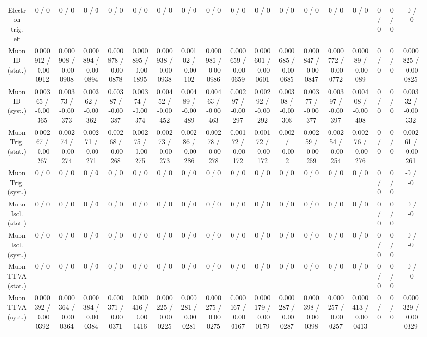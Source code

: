 \documentclass[10pt]{article}
\begin{document}
\begin{table}[htbp]
\begin{center}
\begin{tabular}{|c|c|c|c|c|c|c|c|c|c|c|c|c|c|c|c|c|c|}
  Electron trig. eff & 0 / 0 & 0 / 0 & 0 / 0 & 0 / 0 & 0 / 0 & 0 / 0 & 0 / 0 & 0 / 0 & 0 / 0 & 0 / 0 & 0 / 0 & 0 / 0 & 0 / 0 & 0 / 0 & 0 / 0 & 0 / 0 & -0 / -0 \\ 
  Muon ID (stat.) & 0.000912 / -0.000912 & 0.000908 / -0.000908 & 0.000894 / -0.000894 & 0.000878 / -0.000878 & 0.000895 / -0.000895 & 0.000938 / -0.000938 & 0.00102 / -0.00102 & 0.000986 / -0.000986 & 0.000659 / -0.000659 & 0.000601 / -0.000601 & 0.000685 / -0.000685 & 0.000847 / -0.000847 & 0.000772 / -0.000772 & 0.00089 / -0.00089 & 0 / 0 & 0 / 0 & 0.000825 / -0.000825 \\ 
  Muon ID (syst.) & 0.00365 / -0.00365 & 0.00373 / -0.00373 & 0.00362 / -0.00362 & 0.00387 / -0.00387 & 0.00374 / -0.00374 & 0.00452 / -0.00452 & 0.00489 / -0.00489 & 0.00463 / -0.00463 & 0.00297 / -0.00297 & 0.00292 / -0.00292 & 0.00308 / -0.00308 & 0.00377 / -0.00377 & 0.00397 / -0.00397 & 0.00408 / -0.00408 & 0 / 0 & 0 / 0 & 0.00332 / -0.00332 \\ 
  Muon Trig. (stat.) & 0.00267 / -0.00267 & 0.00274 / -0.00274 & 0.00271 / -0.00271 & 0.00268 / -0.00268 & 0.00275 / -0.00275 & 0.00273 / -0.00273 & 0.00286 / -0.00286 & 0.00278 / -0.00278 & 0.00172 / -0.00172 & 0.00172 / -0.00172 & 0.002 / -0.002 & 0.00259 / -0.00259 & 0.00254 / -0.00254 & 0.00276 / -0.00276 & 0 / 0 & 0 / 0 & 0.00261 / -0.00261 \\ 
  Muon Trig. (syst.) & 0 / 0 & 0 / 0 & 0 / 0 & 0 / 0 & 0 / 0 & 0 / 0 & 0 / 0 & 0 / 0 & 0 / 0 & 0 / 0 & 0 / 0 & 0 / 0 & 0 / 0 & 0 / 0 & 0 / 0 & 0 / 0 & -0 / -0 \\ 
  Muon Isol. (stat.) & 0 / 0 & 0 / 0 & 0 / 0 & 0 / 0 & 0 / 0 & 0 / 0 & 0 / 0 & 0 / 0 & 0 / 0 & 0 / 0 & 0 / 0 & 0 / 0 & 0 / 0 & 0 / 0 & 0 / 0 & 0 / 0 & -0 / -0 \\ 
  Muon Isol. (syst.) & 0 / 0 & 0 / 0 & 0 / 0 & 0 / 0 & 0 / 0 & 0 / 0 & 0 / 0 & 0 / 0 & 0 / 0 & 0 / 0 & 0 / 0 & 0 / 0 & 0 / 0 & 0 / 0 & 0 / 0 & 0 / 0 & -0 / -0 \\ 
  Muon TTVA (stat.) & 0 / 0 & 0 / 0 & 0 / 0 & 0 / 0 & 0 / 0 & 0 / 0 & 0 / 0 & 0 / 0 & 0 / 0 & 0 / 0 & 0 / 0 & 0 / 0 & 0 / 0 & 0 / 0 & 0 / 0 & 0 / 0 & -0 / -0 \\ 
  Muon TTVA (syst.) & 0.000392 / -0.000392 & 0.000364 / -0.000364 & 0.000384 / -0.000384 & 0.000371 / -0.000371 & 0.000416 / -0.000416 & 0.000225 / -0.000225 & 0.000281 / -0.000281 & 0.000275 / -0.000275 & 0.000167 / -0.000167 & 0.000179 / -0.000179 & 0.000287 / -0.000287 & 0.000398 / -0.000398 & 0.000257 / -0.000257 & 0.000413 / -0.000413 & 0 / 0 & 0 / 0 & 0.000329 / -0.000329 \\ 

\end{tabular}
\end{center}
\end{table}
\end{document}
